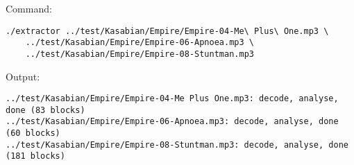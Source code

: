 Command:
\begin{verbatim}
./extractor ../test/Kasabian/Empire/Empire-04-Me\ Plus\ One.mp3 \
    ../test/Kasabian/Empire/Empire-06-Apnoea.mp3 \
    ../test/Kasabian/Empire/Empire-08-Stuntman.mp3
\end{verbatim}
Output:
\begin{verbatim}
../test/Kasabian/Empire/Empire-04-Me Plus One.mp3: decode, analyse, done (83 blocks)
../test/Kasabian/Empire/Empire-06-Apnoea.mp3: decode, analyse, done (60 blocks)
../test/Kasabian/Empire/Empire-08-Stuntman.mp3: decode, analyse, done (181 blocks)
\end{verbatim}

